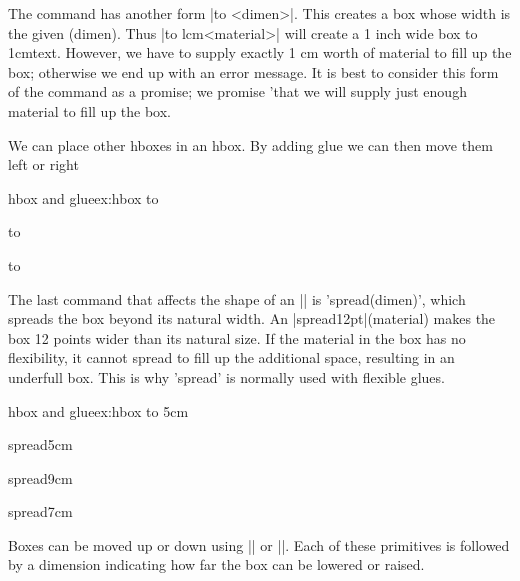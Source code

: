 The  command has another form |\hbox to <dimen>|. This
creates a box whose width is the given (dimen). Thus |\hbox to lcm{<material>}|
will create a 1 inch wide box \hbox to 1cm{text}. However, we have to supply exactly 1 cm worth of
material to fill up the box; otherwise we end up with an error message. It is best
to consider this form of the command as a promise; we promise '\tex that we will
supply just enough material to fill up the box. 

We can place other hboxes in an hbox. By adding glue we can then move them left or right

\begin{texexample}{hbox and glue}{ex:hbox}
\bgroup
\Huge
\hbox to \textwidth{\hfill \hbox{\EOofficerI}\hbox{\EOofficerII}\hbox{\EOofficerIII} \hfill}

\hbox to \textwidth{\hfill \hbox{\EOofficerI}\hbox{\EOofficerII}\hbox{\EOofficerIII} \hfil}

\hbox to \textwidth{\hfill \hbox{\EOofficerI}\hfill \hbox{\EOofficerII}\hfill \hbox{\EOofficerIII} \hfill}
\egroup
\end{texexample}

The last command that affects the shape of an |\hbox| is 'spread(dimen)', which
spreads the box beyond its natural width. An |\hbox spread12pt|{(material)}
makes the box 12 points wider than its natural size. If the material in the box has
no flexibility, it cannot spread to fill up the additional space, resulting in an underfull
box. This is why 'spread' is normally used with flexible glues.

\begin{texexample}{hbox and glue}{ex:hbox}
\bgroup
\LARGE
\hbox to 5cm{\EOofficerI\EOofficerII\hfill\EOofficerIII}

\hbox spread5cm{\hfill\EOofficerI\hfill\EOofficerII\hfil\EOofficerIII}

\hbox spread9cm{\EOofficerI\hfill\EOofficerII\hfil\hfil\EOofficerIII}

\hbox spread7cm{\EOofficerI\hfill\EOofficerII\hfil\hfil\EOofficerIII} 


\makeatletter
\hb@xt@ 5cm {\EOofficerI\EOofficerII\hfill\EOofficerIII}
\makeatother
\egroup
\end{texexample}



Boxes can be moved up or down using |\raise| or |\lower|. Each of these primitives is followed by a dimension indicating how far the box can be lowered or raised.

